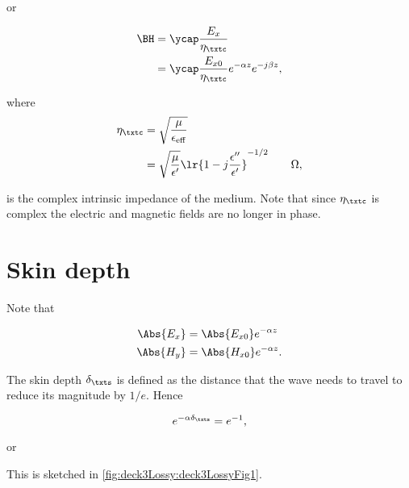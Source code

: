 or

\begin{equation}\label{eqn:uwavesLecture3:220}
\begin{aligned}
\BH
&= \ycap \frac{E_x}{\eta_\txtc}
\\ &= \ycap \frac{E_{x0}}{\eta_\txtc} e^{-\alpha z} e^{-j \beta z},
\end{aligned}
\end{equation}

where
\begin{equation}\label{eqn:uwavesLecture3:240}
\begin{aligned}
\eta_\txtc
&= \sqrt{\frac{\mu}{\epsilon_{\mathrm{eff}}}}
\\ &= \sqrt{\frac{\mu}{\epsilon'}} \lr{ 1 - j \frac{\epsilon''}{\epsilon'} }^{-1/2} \qquad \Omega,
\end{aligned}
\end{equation}

is the complex intrinsic impedance of the medium.  Note that since \( \eta_\txtc \) is complex the electric and magnetic fields are no longer in phase.

\section{Skin depth}

Note that

\begin{equation}\label{eqn:uwavesLecture3:260}
\begin{aligned}
\Abs{ E_x } &= \Abs{ E_{x0} } e^{-\alpha z} \\
\Abs{ H_y } &= \Abs{ H_{x0} } e^{-\alpha z}.
\end{aligned}
\end{equation}

The skin depth \( \delta_\txts \) is defined as the distance that the wave needs to travel to reduce its magnitude by \( 1/e \).  Hence

\begin{equation}\label{eqn:uwavesLecture3:280}
e^{ -\alpha \delta_\txts } = e^{-1},
\end{equation}

or


This is sketched in \cref{fig:deck3Lossy:deck3LossyFig1}.


